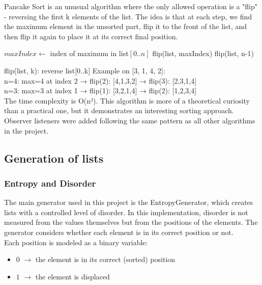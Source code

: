 \documentclass{article}
\begin{document}
Pancake Sort is an unusual algorithm where the only allowed operation is a "flip" - reversing the first k elements of the list. The idea is that at each step, we find the maximum element in the unsorted part, flip it to the front of the list, and then flip it again to place it at its correct final position.

\begin{algorithm}[H]
\caption{Pseudocode for Pancake Sort}
\begin{algorithmic}[1]
        \State $maxIndex \gets$ index of maximum in list$[0..n]$
            \State flip(list, maxIndex)
            \State flip(list, n-1)
        \EndIf
    \EndFor
\end{algorithmic}
\end{algorithm}

flip(list, k): reverse list[0..k]
Example on [3, 1, 4, 2]:\\
n=4: max=4 at index 2 → flip(2): [4,1,3,2] → flip(3): [2,3,1,4] \\
n=3: max=3 at index 1 → flip(1): [3,2,1,4] → flip(2): [1,2,3,4]\\
The time complexity is O(n²). This algorithm is more of a theoretical curiosity than a practical one, but it demonstrates an interesting sorting approach. Observer listeners were added following the same pattern as all other algorithms in the project.


\subsection{Generation of lists}

\subsubsection{Entropy and Disorder}

The main generator used in this project is the EntropyGenerator, which creates lists with a controlled level of disorder. In this implementation, disorder is not measured from the values themselves but from the positions of the elements. The generator considers whether each element is in its correct position or not.\\
Each position is modeled as a binary variable:
\begin{itemize}
    \item $0$ $\rightarrow$ the element is in its correct (sorted) position
    \item $1$ $\rightarrow$ the element is displaced
\end{itemize}
\end{document}
